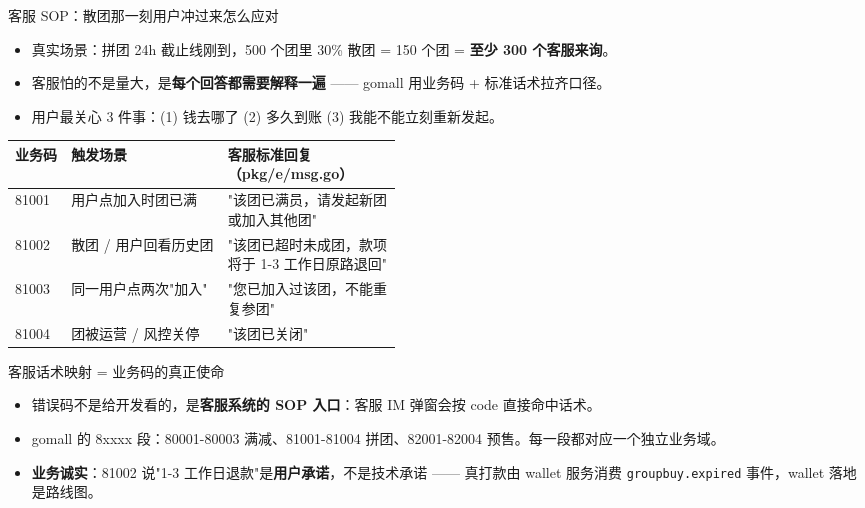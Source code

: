 \documentclass[aspectratio=169,11pt]{beamer}
\begin{document}
\begin{frame}[shrink]{客服 SOP：散团那一刻用户冲过来怎么应对}
\begin{itemize}
  \item 真实场景：拼团 24h 截止线刚到，500 个团里 30\% 散团 = 150 个团 = \textbf{至少 300 个客服来询}。
  \item 客服怕的不是量大，是\textbf{每个回答都需要解释一遍} —— gomall 用业务码 + 标准话术拉齐口径。
  \item 用户最关心 3 件事：(1) 钱去哪了 (2) 多久到账 (3) 我能不能立刻重新发起。
\end{itemize}
\begin{tabular}{@{}llp{0.45\linewidth}@{}}
\toprule
业务码 & 触发场景 & 客服标准回复（pkg/e/msg.go） \\
\midrule
81001 & 用户点加入时团已满 & "该团已满员，请发起新团或加入其他团" \\
81002 & 散团 / 用户回看历史团 & "该团已超时未成团，款项将于 1-3 工作日原路退回" \\
81003 & 同一用户点两次"加入" & "您已加入过该团，不能重复参团" \\
81004 & 团被运营 / 风控关停 & "该团已关闭" \\
\bottomrule
\end{tabular}
\end{frame}

\begin{frame}[shrink]{客服话术映射 = 业务码的真正使命}
\begin{itemize}
  \item 错误码不是给开发看的，是\textbf{客服系统的 SOP 入口}：客服 IM 弹窗会按 code 直接命中话术。
  \item gomall 的 8xxxx 段：80001-80003 满减、81001-81004 拼团、82001-82004 预售。每一段都对应一个独立业务域。
  \item \textbf{业务诚实}：81002 说"1-3 工作日退款"是\textbf{用户承诺}，不是技术承诺 —— 真打款由 wallet 服务消费 \texttt{groupbuy.expired} 事件，wallet 落地是路线图。
\end{itemize}
\end{frame}
\end{document}
